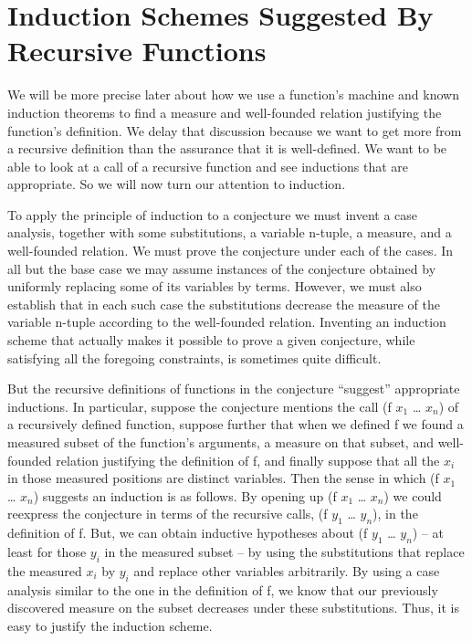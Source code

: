 \documentclass[10pt]{book}
\begin{document}
\section{Induction Schemes Suggested By Recursive Functions}
We will be more precise later about how we use a function's machine
and known induction theorems to find a measure and well-founded relation
justifying the function's definition.
We  delay that discussion because we want to get more
from a recursive definition than
the assurance that it is well-defined.  We want to be able to look at a
call of a recursive function and  see inductions that are
appropriate.  So we will now turn our attention to induction.

To apply the principle of induction to a conjecture we must invent
a case analysis, together with some
substitutions, a variable n-tuple, a measure,
and a well-founded relation.  We must prove the conjecture under each
of the cases.  In all but the base case we may assume instances
of the conjecture obtained by uniformly replacing some of its variables
by terms.  However, we must also establish that in each such case the
substitutions decrease the measure of the variable n-tuple according to the
well-founded relation.  Inventing an induction scheme that actually makes it
possible to prove a given conjecture, while satisfying all the foregoing
constraints, is sometimes quite difficult.

But the recursive definitions
of functions in the conjecture ``suggest'' appropriate inductions.
In particular, suppose the conjecture mentions the call
(f $x_{1}$ \ldots{} $x_{n}$) of a recursively defined function, suppose further that
when we defined f we found a measured subset of the function's arguments,
a measure on that subset, and well-founded
relation justifying the definition of f, and finally suppose that all the $x_{i}$
in those measured positions are distinct variables.
Then the sense in which (f $x_{1}$ \ldots{} $x_{n}$) suggests an induction is
as follows.  By opening up (f $x_{1}$ \ldots{} $x_{n}$) we could reexpress the
conjecture in terms of the recursive calls, (f $y_{1}$ \ldots{} $y_{n}$), in
the definition of f.  But, we can obtain inductive hypotheses
about (f $y_{1}$ \ldots{} $y_{n}$)  -- at least
for those $y_{i}$ in the measured subset -- by using the substitutions that
replace the measured $x_{i}$ by $y_{i}$ and replace other variables arbitrarily.
By using a case analysis similar to the one in the definition of f, we
know that our previously discovered measure on the subset
decreases under these substitutions.  Thus, it is easy to
justify the induction scheme.
\end{document}
